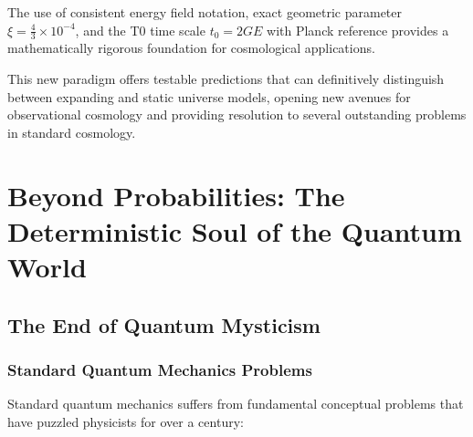 \documentclass[12pt,a4paper]{report}
\newcommand{\tzero}{t_0}                  %
\begin{document}
	The use of consistent energy field notation, exact geometric parameter $\xi = \frac{4}{3} \times 10^{-4}$, and the T0 time scale $\tzero = 2GE$ with Planck reference provides a mathematically rigorous foundation for cosmological applications.
	
	This new paradigm offers testable predictions that can definitively distinguish between expanding and static universe models, opening new avenues for observational cosmology and providing resolution to several outstanding problems in standard cosmology.
\chapter{Beyond Probabilities: The Deterministic Soul of the Quantum World}
\label{chap:deterministic_qm}

\section{The End of Quantum Mysticism}
\label{sec:end_quantum_mysticism}

\subsection{Standard Quantum Mechanics Problems}
\label{subsec:standard_qm_problems}

Standard quantum mechanics suffers from fundamental conceptual problems that have puzzled physicists for over a century:
\end{document}
